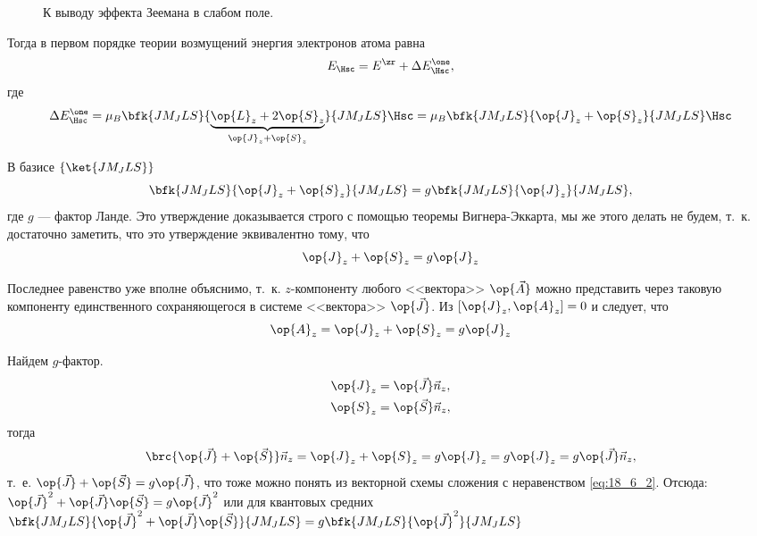 \begin{figure}[h!]
\centering
{}
\caption{К выводу эффекта Зеемана в слабом поле.} \label{fig:18_1}
\end{figure}

Тогда в первом порядке теории возмущений энергия электронов атома равна 
$$
E_{\Hsc} = E^\zr + \Delta E_{\Hsc}^\one,
$$
где 
$$
\Delta E_{\Hsc}^\one = \mu_B \bfk{J M_J L S}{\underbrace{\op{L}_z + 2\op{S}_z}_{\op{J}_z + \op{S}_z}}{J M_J L S} \Hsc = \mu_B \bfk{J M_J L S}{\op{J}_z + \op{S}_z}{J M_J L S} \Hsc
$$

В базисе $\{ \ket{J M_J L S}\}$
$$
\bfk{J M_J L S}{\op{J}_z + \op{S}_z}{J M_J L S} = g\bfk{J M_J L S}{\op{J}_z}{J M_J L S},
$$
где $g$ --- фактор Ланде. Это утверждение доказывается строго с помощью теоремы Вигнера-Эккарта, мы же этого делать не будем, т.~к. достаточно заметить, что это утверждение эквивалентно тому, что
$$
\op{J}_z + \op{S}_z = g\op{J}_z
$$

Последнее равенство уже вполне объяснимо, т.~к. $z$-компоненту любого <<вектора>> $\op{\vec{A}}$ можно представить через таковую компоненту единственного сохраняющегося в системе <<вектора>> $\op{\vec{J}}$. Из $[\op{J}_z, \op{A}_z] = 0$ и следует, что 
$$
\op{A}_z = \op{J}_z + \op{S}_z = g\op{J}_z
$$

Найдем $g$-фактор.
\begin{gather*}
\op{J}_z = \op{\vec{J}} \vec{n}_z, \\
\op{S}_z = \op{\vec{S}} \vec{n}_z,
\end{gather*}
тогда
$$
\brc{\op{\vec{J}} + \op{\vec{S}}}\vec{n}_z = \op{J}_z + \op{S}_z = g \op{J}_z = g \op{J}_z = g \op{\vec{J}} \vec{n}_z,
$$
т.~е. $\op{\vec{J}} + \op{\vec{S}} = g\op{\vec{J}}$, что тоже можно понять из векторной схемы сложения с неравенством \eqref{eq:18_6_2}. Отсюда: 
$\op{\vec{J}}^2 + \op{\vec{J}} \op{\vec{S}} = g \op{\vec{J}}^2$ или для квантовых средних $\bfk{J M_J L S}{\op{\vec{J}}^2 + \op{\vec{J}} \op{\vec{S}}}{J M_J L S} = g \bfk{J M_J L S}{\op{\vec{J}}^2}{J M_J L S}$

